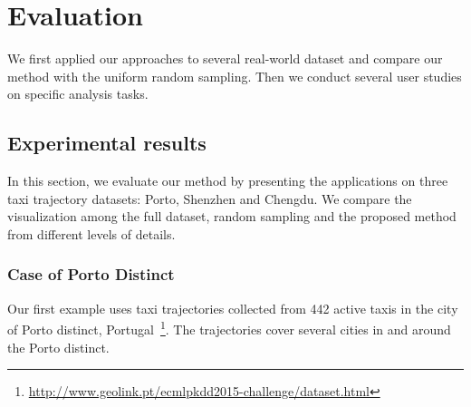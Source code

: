 \section{Evaluation}
We first applied our approaches to several real-world dataset and compare our method with the uniform random sampling. Then we conduct several user studies on specific analysis tasks. 
\subsection{Experimental results}
In this section, we evaluate our method by presenting the applications on three taxi trajectory datasets: Porto, Shenzhen and Chengdu. We compare the visualization among the full dataset, random sampling and the proposed method from different levels of details. 
\subsubsection{Case of Porto Distinct}
Our first example uses taxi trajectories collected from 442 active taxis in the city of Porto distinct, Portugal~\footnote{\url{http://www.geolink.pt/ecmlpkdd2015-challenge/dataset.html}}. The trajectories cover several cities in and around the Porto distinct.

